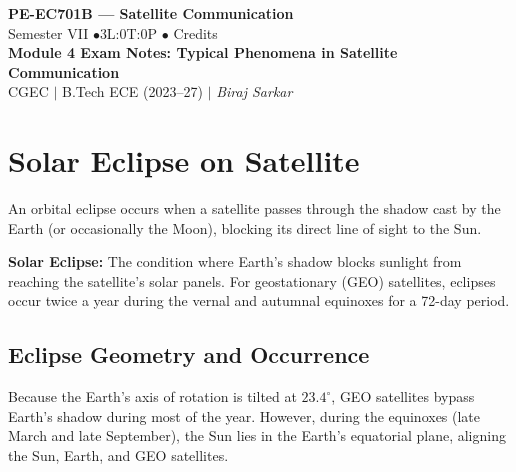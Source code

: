 \documentclass[12pt,a4paper]{article}
\begin{document}

\begin{center}
  {\LARGE\bfseries\color{myred} PE-EC701B --- Satellite Communication}\\[5pt]
  {\normalsize\color{mydark} Semester VII \quad$\bullet$\quad 3L:0T:0P \quad$\bullet$ Credits}\\[3pt]
  {\normalsize\color{myteal}\textbf{Module 4 Exam Notes: Typical Phenomena in Satellite Communication}}\\[3pt]
  {\small\color{mydark} CGEC \;$|$\; B.Tech ECE (2023--27) \;$|$\; \textit{Biraj Sarkar}}
\end{center}
\vspace{2pt}
\noindent{\color{myred}\rule{\linewidth}{1.5pt}}
\vspace{2pt}

\hypersetup{linkcolor=mydark}
\tableofcontents
\hypersetup{linkcolor=myteal}
\newpage

\section{Solar Eclipse on Satellite}

An orbital eclipse occurs when a satellite passes through the shadow cast by the Earth (or occasionally the Moon), blocking its direct line of sight to the Sun.

\begin{tcolorbox}[defbox]
\textbf{Solar Eclipse:} The condition where Earth's shadow blocks sunlight from reaching the satellite's solar panels. For geostationary (GEO) satellites, eclipses occur twice a year during the vernal and autumnal equinoxes for a 72-day period.
\end{tcolorbox}

\subsection{Eclipse Geometry and Occurrence}
Because the Earth's axis of rotation is tilted at $23.4^\circ$, GEO satellites bypass Earth's shadow during most of the year. However, during the equinoxes (late March and late September), the Sun lies in the Earth's equatorial plane, aligning the Sun, Earth, and GEO satellites.
\end{document}
